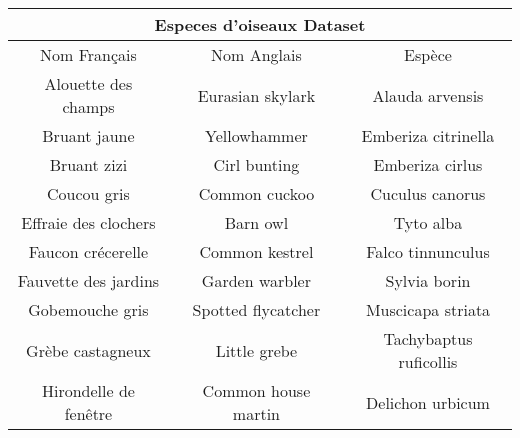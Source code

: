 \begin{center}
  \begin{tabular}{ |c|c|c|  }
   \hline
   \multicolumn{3}{|c|}{Especes d'oiseaux Dataset} \\
   \hline
   Nom Français& Nom Anglais& Espèce\\
   \hline
   Alouette des champs & Eurasian skylark & Alauda arvensis\\
   Bruant jaune& Yellowhammer & Emberiza citrinella\\
   Bruant zizi& Cirl bunting & Emberiza cirlus\\
   Coucou gris& Common cuckoo &  Cuculus canorus\\
   Effraie des clochers& Barn owl & Tyto alba\\
   Faucon crécerelle& Common kestrel & Falco tinnunculus\\
   Fauvette des jardins& Garden warbler & Sylvia borin\\
   Gobemouche gris& Spotted flycatcher & Muscicapa striata\\
   Grèbe castagneux& Little grebe & Tachybaptus ruficollis\\
   Hirondelle de fenêtre& Common house martin & Delichon urbicum\\
   \hline
  \end{tabular}
\end{center}

